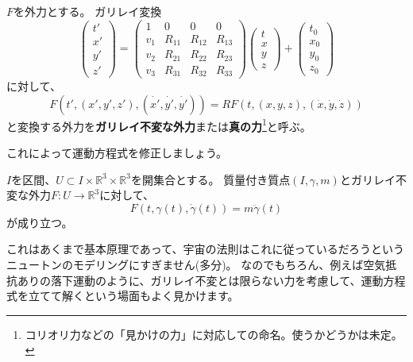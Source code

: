 \begin{definition}
  $F$を外力とする。
  ガリレイ変換
  \[
    \begin{pmatrix}
      t'\\x'\\y'\\z'
    \end{pmatrix}
    =
    \begin{pmatrix}
      1 & 0 & 0 & 0 \\
      v_1 & R_{11} & R_{12} & R_{13} \\
      v_2 & R_{21} & R_{22} & R_{23} \\
      v_3 & R_{31} & R_{32} & R_{33}
    \end{pmatrix}
    \begin{pmatrix}
      t\\x\\y\\z
    \end{pmatrix}
    +
    \begin{pmatrix}
      t_0\\x_0\\y_0\\z_0
    \end{pmatrix}
  \]
  に対して、
  \[
    F(t',(x',y',z'),(\dot{x'},\dot{y'},\dot{y'}))=RF(t,(x,y,z),(\dot{x},\dot{y},\dot{z}))
  \]
  と変換する外力を\textbf{ガリレイ不変な外力}または\textbf{真の力}\footnote{
    コリオリ力などの「見かけの力」に対応しての命名。使うかどうかは未定。
  }と呼ぶ。
\end{definition}

これによって運動方程式を修正しましょう。
\begin{definition}[運動方程式]
  $I$を区間、$U\subset I\times\mathbb{R}^3\times\mathbb{R}^3$を開集合とする。
  質量付き質点$(I,\gamma,m)$とガリレイ不変な外力$F:U\to\mathbb{R}^3$に対して、
  \[
    F(t,\gamma(t),\dot\gamma(t))=m\ddot\gamma(t)
  \]
  が成り立つ。
\end{definition}

これはあくまで基本原理であって、宇宙の法則はこれに従っているだろうというニュートンのモデリングにすぎません(多分)。
なのでもちろん、例えば空気抵抗ありの落下運動のように、ガリレイ不変とは限らない力を考慮して、運動方程式を立てて解くという場面もよく見かけます。
